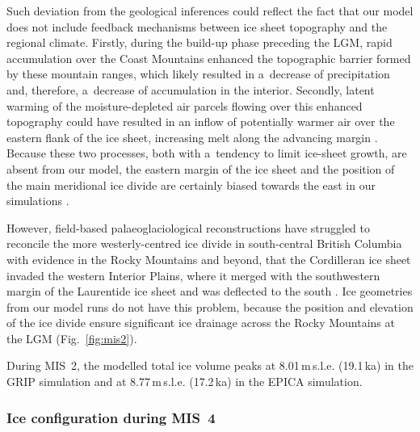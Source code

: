 \documentclass[tc, manuscript]{copernicus}
\begin{document}
      Such deviation from the geological inferences could reflect the fact
      that our model does not include feedback mechanisms between ice sheet
      topography and the regional climate. Firstly, during the build-up
      phase preceding the LGM, rapid accumulation over the Coast Mountains
      enhanced the topographic barrier formed by these mountain ranges,
      which likely resulted in a~decrease of precipitation and, therefore,
      a~decrease of accumulation in the interior. Secondly, latent warming
      of the moisture-depleted air parcels flowing over this enhanced
      topography could have resulted in an inflow of potentially warmer air
      over the eastern flank of the ice sheet, increasing melt along the
      advancing margin \citep[cf.][]{Langen.etal.2012}. Because these two
      processes, both with a~tendency to limit ice-sheet growth, are absent
      from our model, the eastern margin of the ice sheet and the position
      of the main meridional ice divide are certainly biased towards the
      east in our simulations \citep{Seguinot.etal.2014}.

      However, field-based palaeoglaciological reconstructions have
      struggled to reconcile the more westerly-centred ice divide in
      south-central British Columbia with evidence in the Rocky Mountains
      and beyond, that the Cordilleran ice sheet invaded the western
      Interior Plains, where it merged with the southwestern margin of the
      Laurentide ice sheet and was deflected to the south
      \citep{Jackson.etal.1997, Bednarski.Smith.2007, Kleman.etal.2010,
      Margold.etal.2013, Margold.etal.2013a}. Ice geometries from our model
      runs do not have this problem, because the position and elevation of
      the ice divide ensure significant ice drainage across the Rocky
      Mountains at the LGM (Fig.~\ref{fig:mis2}).

      During MIS~2, the modelled total ice volume peaks at
      8.01\,\unit{m}\,s.l.e. (19.1\,\unit{ka}) in the GRIP simulation and at
      8.77\,\unit{m}\,s.l.e. (17.2\,\unit{ka}) in the EPICA simulation.

\subsubsection{Ice configuration during MIS~4}
\label{sec:mis4}
\end{document}
